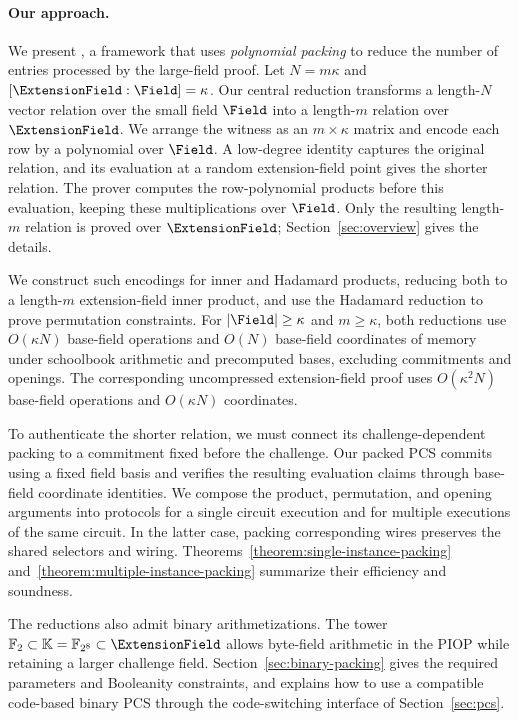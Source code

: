 \paragraph{Our approach.}
We present \methodname, a framework that uses \emph{polynomial
packing} to reduce the number of entries processed by the
large-field proof. Let \(N=m\kappa\) and
\([\ExtensionField:\Field]=\kappa\).
Our central reduction transforms a length-\(N\) vector relation
over the small field \(\Field\) into a length-\(m\) relation over
\(\ExtensionField\).
We arrange the witness as an \(m\times\kappa\) matrix and encode
each row by a polynomial over \(\Field\). A low-degree identity
captures the original relation, and its evaluation at a random
extension-field point gives the shorter relation.
The prover computes the row-polynomial products before this
evaluation, keeping these multiplications over \(\Field\).
Only the resulting length-\(m\) relation is proved over
\(\ExtensionField\); Section~\ref{sec:overview} gives the details.

We construct such encodings for inner and Hadamard products,
reducing both to a length-\(m\) extension-field inner product,
and use the Hadamard reduction to prove permutation constraints.
For \(|\Field|\geq\kappa\) and \(m\geq\kappa\), both reductions
use \(O(\kappa N)\) base-field operations and \(O(N)\) base-field
coordinates of memory under schoolbook arithmetic and precomputed
bases, excluding commitments and openings.
The corresponding uncompressed extension-field proof uses
\(O(\kappa^2N)\) base-field operations and \(O(\kappa N)\)
coordinates.

To authenticate the shorter relation, we must connect its
challenge-dependent packing to a commitment fixed before the
challenge. Our packed PCS commits using a fixed field basis and
verifies the resulting evaluation claims through base-field
coordinate identities.
We compose the product, permutation, and opening arguments into
protocols for a single circuit execution and for multiple
executions of the same circuit. In the latter case, packing
corresponding wires preserves the shared selectors and wiring.
Theorems~\ref{theorem:single-instance-packing}
and~\ref{theorem:multiple-instance-packing} summarize their
efficiency and soundness.

The reductions also admit binary arithmetizations. The tower
\(\mathbb F_2\subset\mathbb K=\mathbb F_{2^8}\subset\ExtensionField\)
allows byte-field arithmetic in the PIOP while retaining a larger
challenge field.
Section~\ref{sec:binary-packing} gives the required parameters and
Booleanity constraints, and explains how to use a compatible
code-based binary PCS through the code-switching interface of
Section~\ref{sec:pcs}.

